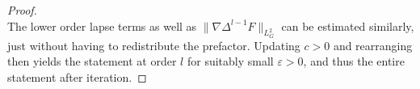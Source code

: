 \documentclass[11pt,leqno,textwidth=10cm]{amsart}
\numberwithin{equation}{section}
\theoremstyle{definition}
\theoremstyle{plain}
\newcommand{\1}{\mathbbm{1}}
\newcommand{\E}{\mathcal{E}}
\newcommand{\Ric}{\text{\normalfont{Ric}}}
\renewcommand{\epsilon}{\varepsilon}
\newcommand{\Lap}{\Delta}
\begin{document}
\begin{proof}
\begin{equation*}
\end{equation*}
The lower order lapse terms as well as $\|\nabla\Lap^{l-1}F\|_{L^2_G}$ can be estimated similarly, just without having to redistribute the prefactor. Updating $c>0$ and rearranging then yields the statement at order $l$ for suitably small $\epsilon>0$, and thus the entire statement after iteration.
\end{proof}
\end{document}
